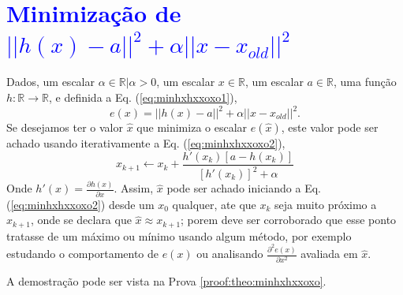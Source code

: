 \section{\textcolor{blue}{Minimização de $||h(x)-a||^2+\alpha ||x-x_{old}||^2$}}

\begin{theorem}\label{theo:minhxhxxoxo}
Dados,
um escalar $\alpha \in \mathbb{R} | \alpha > 0$, 
um escalar $x \in \mathbb{R}$, 
um escalar $a \in \mathbb{R}$,  
uma função $h:\mathbb{R} \rightarrow \mathbb{R}$, e 
definida a Eq. (\ref{eq:minhxhxxoxo1}),
\begin{equation}\label{eq:minhxhxxoxo1}
e(x)=||h(x)-a||^2+\alpha ||x-x_{old}||^2.
\end{equation}
Se desejamos ter o valor $\hat{x}$ que minimiza o escalar $e(\hat{x})$,
este valor pode ser achado usando iterativamente a Eq. (\ref{eq:minhxhxxoxo2}),
\begin{equation}\label{eq:minhxhxxoxo2}
x_{k+1} \leftarrow x_k+
\frac{ h'(x_k) \left[a-h(x_k)\right] }{\left[h'(x_k)\right]^2+\alpha}
\end{equation}
Onde  $h'(x)=\frac{\partial h(x)}{\partial x}$.
Assim, $\hat{x}$ pode ser achado iniciando a Eq. (\ref{eq:minhxhxxoxo2}) desde um $x_{0}$ qualquer, ate que $x_{k}$ seja muito próximo a $x_{k+1}$,
onde se declara que $\hat{x} \approx x_{k+1}$; porem deve ser corroborado
que esse ponto tratasse de um máximo ou mínimo usando algum método, por exemplo estudando o comportamento 
de $e(x)$ ou analisando  $\frac{\partial^2 e(x)}{\partial x^2}$ avaliada em $\hat{x}$.

\FALTAPROVA
A demostração pode ser vista na Prova \ref{proof:theo:minhxhxxoxo}.
\end{theorem}

